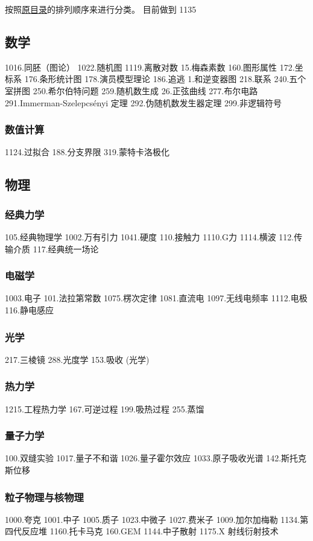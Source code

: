 
\begin{issues}
\issueDraft
\end{issues}

按照\href{https://wuli.wiki/assets/sogou}{原目录}的排列顺序来进行分类。 目前做到 1135

\subsection{数学}
1016.同胚（图论）
1022.随机图
1119.离散对数
15.梅森素数
160.图形属性
172.坐标系
176.条形统计图
178.演员模型理论
186.追逃
1.和逆变器图
218.联系
240.五个室拼图
250.希尔伯特问题
259.随机数生成
26.正弦曲线
277.布尔电路
291.Immerman-Szelepcsényi 定理
292.伪随机数发生器定理
299.非逻辑符号
\subsubsection{数值计算}
1124.过拟合
188.分支界限
319.蒙特卡洛极化

\subsection{物理}
\subsubsection{经典力学}
105.经典物理学
1002.万有引力
1041.硬度
110.接触力
1110.G力
1114.横波
112.传输介质
117.经典统一场论
\subsubsection{电磁学}
1003.电子
101.法拉第常数
1075.楞次定律
1081.直流电
1097.无线电频率
1112.电极
116.静电感应
\subsubsection{光学}
217.三棱镜
288.光度学
153.吸收 (光学)
\subsubsection{热力学}
1215.工程热力学
167.可逆过程
199.吸热过程
255.蒸馏
\subsubsection{量子力学}
100.双缝实验
1017.量子不和谐
1026.量子霍尔效应
1033.原子吸收光谱
142.斯托克斯位移
\subsubsection{粒子物理与核物理}
1000.夸克
1001.中子
1005.质子
1023.中微子
1027.费米子
1009.加尔加梅勒
1134.第四代反应堆
1160.托卡马克
160.GEM
1144.中子散射
1175.X 射线衍射技术
